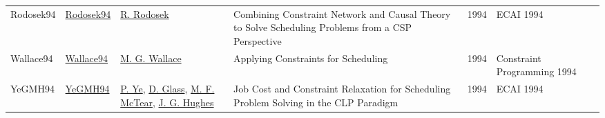 {\begin{longtable}{p{2cm}p{2cm}p{5cm}p{10cm}rp{3cm}l}
Rodosek94 & \href{}{Rodosek94} & \hyperref[auth:a297]{R. Rodosek} & Combining Constraint Network and Causal Theory to Solve Scheduling Problems from a {CSP} Perspective & 1994 & ECAI 1994 & \cite{Rodosek94}\\
Wallace94 & \href{}{Wallace94} & \hyperref[auth:a117]{M. G. Wallace} & Applying Constraints for Scheduling & 1994 & Constraint Programming 1994 & \cite{Wallace94}\\
YeGMH94 & \href{}{YeGMH94} & \hyperref[auth:a1258]{P. Ye}, \hyperref[auth:a1259]{D. Glass}, \hyperref[auth:a1260]{M. F. McTear}, \hyperref[auth:a1261]{J. G. Hughes} & Job Cost and Constraint Relaxation for Scheduling Problem Solving in the {CLP} Paradigm & 1994 & ECAI 1994 & \cite{YeGMH94}\\
\end{longtable}
}

